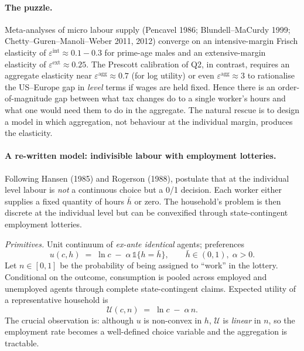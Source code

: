 \documentclass[11pt,a4paper]{article}
\begin{document}
\paragraph{The puzzle.} Meta-analyses of micro labour supply (Pencavel 1986; Blundell--MaCurdy 1999; Chetty--Guren--Manoli--Weber 2011, 2012) converge on an intensive-margin Frisch elasticity of $\varepsilon^{\text{int}}\!\approx\!0.1{-}0.3$ for prime-age males and an extensive-margin elasticity of $\varepsilon^{\text{ext}}\!\approx\!0.25$. The Prescott calibration of Q2, in contrast, requires an aggregate elasticity near $\varepsilon^{\text{agg}}\!\approx\!0.7$ (for log utility) or even $\varepsilon^{\text{agg}}\!\approx\!3$ to rationalise the US--Europe gap in \emph{level} terms if wages are held fixed. Hence there is an order-of-magnitude gap between what tax changes do to a single worker's hours and what one would need them to do in the aggregate. The natural rescue is to design a model in which aggregation, not behaviour at the individual margin, produces the elasticity.

\paragraph{A re-written model: indivisible labour with employment lotteries.}
Following Hansen (1985) and Rogerson (1988), postulate that at the individual level labour is \emph{not} a continuous choice but a 0/1 decision. Each worker either supplies a fixed quantity of hours $\bar h$ or zero. The household's problem is then discrete at the individual level but can be convexified through state-contingent employment lotteries.

\smallskip
\emph{Primitives.} Unit continuum of \emph{ex-ante identical} agents; preferences
\begin{equation}
u(c,h)\;=\;\ln c \;-\;\alpha\,\mathbb{1}\{h=\bar h\},\qquad
\bar h\in(0,1),\;\alpha>0.
\label{eq:indiv_util}
\end{equation}
Let $n\in[0,1]$ be the probability of being assigned to ``work'' in the lottery. Conditional on the outcome, consumption is pooled across employed and unemployed agents through complete state-contingent claims. Expected utility of a representative household is
\begin{equation}
\mathcal{U}(c,n)\;=\;\ln c \;-\;\alpha\, n.
\label{eq:agg_util}
\end{equation}
The crucial observation is: although $u$ is non-convex in $h$, $\mathcal{U}$ is \emph{linear} in $n$, so the employment rate becomes a well-defined choice variable and the aggregation is tractable.
\end{document}
